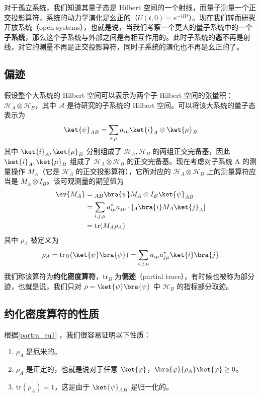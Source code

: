 

对于孤立系统，我们知道其量子态是 Hilbert 空间的一个射线，而量子测量一个正交投影算符，系统的动力学演化是幺正的（$U(t,0)=e^{-iHt}$）。现在我们转而研究开放系统（open systems），也就是说，当我们考察一个更大的量子系统中的一个\textbf{子系统}，那么这个子系统与外部之间是有相互作用的。此时子系统的\textbf{态}不再是射线，对它的测量不再是正交投影算符，同时子系统的演化也不再是幺正的了。
\subsection{偏迹}
假设整个大系统的 Hilbert 空间可以表示为两个子 Hilbert 空间的张量积：$\mathcal{H}_A\otimes \mathcal{H}_B$，其中 $\mathcal A$ 是待研究的子系统的 Hilbert 空间。可以将该大系统的量子态表示为
\begin{equation}
\ket{\psi}_{AB}=\sum_{i,\mu}a_{i\mu}\ket{i}_A\otimes \ket{\mu}_B
\end{equation}
其中 $\ket{i}_A,\ket{\mu}_B$ 分别组成了 $\mathcal{H}_A, \mathcal{H}_B$ 的两组正交完备基，因此 $\ket{i}_A,\ket{\mu}_B$ 组成了 $\mathcal{H}_A\otimes \mathcal{H}_B$ 的正交完备基。现在考虑对子系统 A 的测量操作 $M_A$（它是 $\mathcal H_A$ 的正交投影算符），它所对应的 $\mathcal{H}_A\otimes \mathcal{H}_B$ 上的测量算符应当是 $M_A\otimes I_B$。该可观测量的期望值为
\begin{equation}
\begin{aligned}
\ev{M_A}&={}_{AB}\bra{\psi}M_A\otimes I_B \ket{\psi}_{AB}\\
&=\sum_{i,j,\mu}a_{i\mu}^*a_{j\mu} \cdot [{}_A\bra{i} M_A \ket{j}_A]\\
&=\text{tr}(M_A \rho_A)
\end{aligned}
\end{equation}
其中 $\rho_A$ 被定义为
\begin{equation}\label{partra_eq1}
\rho_A=\text{tr}_B(\ket{\psi}\bra{\psi})=\sum_{i,j,\mu}a_{i\mu}a_{j\mu}^*\ket{i}\bra{j}
\end{equation}
我们称该算符为\textbf{约化密度算符}，$\text{tr}_B$ 为\textbf{偏迹}（partial trace），有时候也被称为部分迹，也就是说，我们只对 $\rho=\ket{\psi}\bra{\psi}$ 中 $\mathcal{H}_B$ 的指标部分取迹。

\subsection{约化密度算符的性质}
根据\autoref{partra_eq1} ，我们很容易证明以下性质：
\begin{enumerate}
\item $\rho_A$ 是厄米的。
\item $\rho_A$ 是正定的，也就是说对于任意 $\ket{\varphi}$，$\bra{\varphi}{\rho_A}\ket{\varphi}\ge 0$。
\item $\text{tr}(\rho_A)=1$，这是由于 $\ket{\psi}_{AB}$ 是归一化的。
\end{enumerate}

